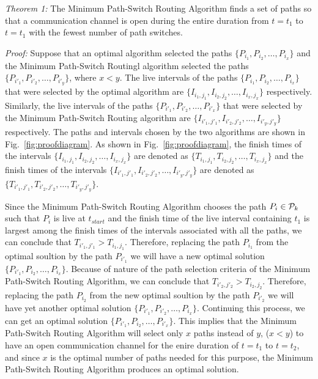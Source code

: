 \documentclass[10pt]{IEEEtran}
\begin{document}
\vspace{0.1 in}
\noindent
{\em  Theorem 1:} The Minimum Path-Switch Routing Algorithm finds a set of paths so that a communication channel is open during the entire duration from $t = t_1$ to $t = t_1$ with the fewest number of path switches.

\vspace{0.1 in}
\noindent
{\em  Proof:} Suppose that an optimal algorithm selected the paths $\lbrace P_{i_1}, P_{i_2}, \ldots, P_{i_x}\rbrace$ and the Minimum Path-Switch Routingl algorithm selected the paths $\lbrace P_{i'_1}, P_{i'_2}, \ldots, P_{i'_y} \rbrace$, where $x < y$. The live intervals of the paths $\lbrace P_{i_1}, P_{i_2}, \ldots, P_{i_x}\rbrace$ that were selected by the optimal algorithm are $\lbrace I_{i_1, j_1}, I_{i_2, j_2}, \ldots, I_{i_x, j_x}\rbrace$ respectively. Similarly, the live intervals of the paths $\lbrace P_{i'_1}, P_{i'_2}, \ldots, P_{i'_x}\rbrace$ that were selected by the Minimum Path-Switch Routing algorithm are $\lbrace I_{i'_1, j'_1}, I_{i'_2, j'_2}, \ldots, I_{i'_y, j'_y}\rbrace$ respectively. The paths and intervals chosen by the two algorithms are shown in Fig.~\ref{fig:proofdiagram}. As shown in Fig.~\ref{fig:proofdiagram}, the finish times of the intervals $\lbrace I_{i_1, j_1}, I_{i_2, j_2}, \ldots, I_{i_x, j_x}\rbrace$ are denoted as $\lbrace T_{i_1, j_1}, T_{i_2, j_2}, \ldots, T_{i_x, j_x}\rbrace$ and the finish times of the intervals $\lbrace I_{i'_1, j'_1}, I_{i'_2, j'_2}, \ldots, I_{i'_y, j'_y}\rbrace$ are denoted as $\lbrace T_{i'_1, j'_1}, T_{i'_2, j'_2}, \ldots, T_{i'_y, j'_y}\rbrace$.

Since the Minimum Path-Switch Routing Algorithm chooses the path $P_i \in {\cal P}_k$ such that $P_i$ is live at $t_{start}$ and the finish time of the live interval containing $t_1$  is largest among the finish times of the intervals associated with all the paths, we can conclude that $T_{i'_1, j'_1} > T_{i_1, j_1}$. Therefore, replacing the path $P_{i_1}$ from the optimal soultion by the path $P_{i'_1}$ we will have a new optimal solution $\lbrace P_{i'_1}, P_{i_2}, \ldots, P_{i_x}\rbrace$. Because of nature of the path selection criteria of the Minimum Path-Switch Routing Algorithm, we can conclude that $T_{i'_2, j'_2} > T_{i_2, j_2}$. Therefore, replacing the path $P_{i_2}$ from the new optimal soultion by the path $P_{i'_2}$ we will have yet another optimal solution $\lbrace P_{i'_1}, P_{i'_2}, \ldots, P_{i_x}\rbrace$. Continuing this process, we can  get an optimal solution  $\lbrace P_{i'_1}, P_{i_2}, \ldots, P_{i'_x}\rbrace$. This implies that the Minimum Path-Switch Routing Algorithm will select only $x$ paths instead of $y$, ($x < y$) to have an open communication channel for the enire duration of $t = t_1$ to $t = t_2$, and since $x$ is the optimal number of paths needed for this purpose, the Minimum Path-Switch Routing Algorithm produces an optimal solution.
\end{document}
